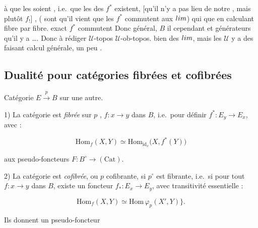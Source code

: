 \documentclass[11pt,a4paper]{article}
\begin{document}

\ill{} à  que les \ill{} soient ,
i.e.\ que les  des $f^{*}$ existent, [qu'il n'y a
pas lieu \ill{} de notre \ill{}, mais plutôt $f_{!}$] , (\ill{} sont \ill{} qu'il vient
\ill{}  \ill{} que les $f^{*}$ commutent aux $\varprojlim$)
\ill{} qui  \ill{} que \ill{} \ill{} en calculant fibre par
fibre. \ill{} exact \ill{} \ill{} \ill{} $f^{*}$ \ill{} commutent \ill{} Donc
\ill{} \ill{}  général, \ill{} $B$ \ill{} \ill{} il \ill{}
cependant \ill{} \ill{} \ill{} et générateurs \ill{} qu'il y a \ill{}
 \ldots. Donc \ill{} à rédiger \ill{} $\mathcal{U}$-topos
\ill{} $\mathcal{U}$-ob-topos. \ill{} bien des $\varprojlim$, mais les \ill{}
$\mathcal{U}$ y a des \ill{} faisant \ill{} calcul \ill{} générale, \ill{} un
peu .

\subsection*{Dualité pour catégories fibrées et cofibrées}


Catégorie $E \xrightarrow{\;p\;} B$ sur une autre.

1) La catégorie est \emph{fibrée} sur $p$ , \ill{} \ill{} $f
: x \to y$ dans $B$, i.e.\ pour définir $f^{*} : E_{y} \to E_{x}$, avec
 :

\[ \mathrm{Hom}_{f}(X, Y) \simeq \mathrm{Hom}_{\mathrm{id}_{x}}
   \bigl(X, f^{*}(Y)\bigr) \]

\ill{} \ill{} \ill{} aux pseudo-foncteurs $F : B^{\circ} \to (\mathrm{Cat})$.

2) La catégorie est \emph{cofibrée}, ou $p$ cofibrante, si $p^{\circ}$ est
fibrante, i.e.\ si pour tout $f : x \to y$ dans $B$, existe un foncteur $f_{*}
: E_{x} \to E_{y}$, avec transitivité essentielle :

\[ \mathrm{Hom}_{f}(X, Y) \simeq \mathrm{Hom}\,\varphi_{p}(X', Y) \}. \]


Ils donnent  \ill{} un pseudo-foncteur
\end{document}
